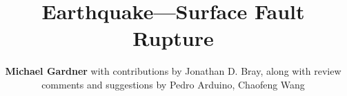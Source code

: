%
%
%


%
%
%
%
%
%
%
%

\title{Earthquake---Surface Fault Rupture}
\author{
    \textbf{Michael Gardner}
    with contributions by Jonathan D. Bray,
    \newline
    along with review comments and suggestions by Pedro Arduino, Chaofeng Wang
}
\tocauthor{}
%
%
\maketitle

